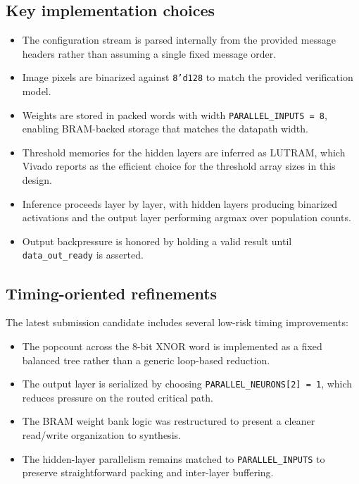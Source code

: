 \documentclass[11pt]{article}
\begin{document}
\subsection{Key implementation choices}

\begin{itemize}[leftmargin=1.5em]
\item The configuration stream is parsed internally from the provided message headers rather than assuming a single fixed message order.
\item Image pixels are binarized against \texttt{8'd128} to match the provided verification model.
\item Weights are stored in packed words with width \texttt{PARALLEL\_INPUTS = 8}, enabling BRAM-backed storage that matches the datapath width.
\item Threshold memories for the hidden layers are inferred as LUTRAM, which Vivado reports as the efficient choice for the threshold array sizes in this design.
\item Inference proceeds layer by layer, with hidden layers producing binarized activations and the output layer performing argmax over population counts.
\item Output backpressure is honored by holding a valid result until \texttt{data\_out\_ready} is asserted.
\end{itemize}

\subsection{Timing-oriented refinements}

The latest submission candidate includes several low-risk timing improvements:

\begin{itemize}[leftmargin=1.5em]
\item The popcount across the 8-bit XNOR word is implemented as a fixed balanced tree rather than a generic loop-based reduction.
\item The output layer is serialized by choosing \texttt{PARALLEL\_NEURONS[2] = 1}, which reduces pressure on the routed critical path.
\item The BRAM weight bank logic was restructured to present a cleaner read/write organization to synthesis.
\item The hidden-layer parallelism remains matched to \texttt{PARALLEL\_INPUTS} to preserve straightforward packing and inter-layer buffering.
\end{itemize}
\end{document}
